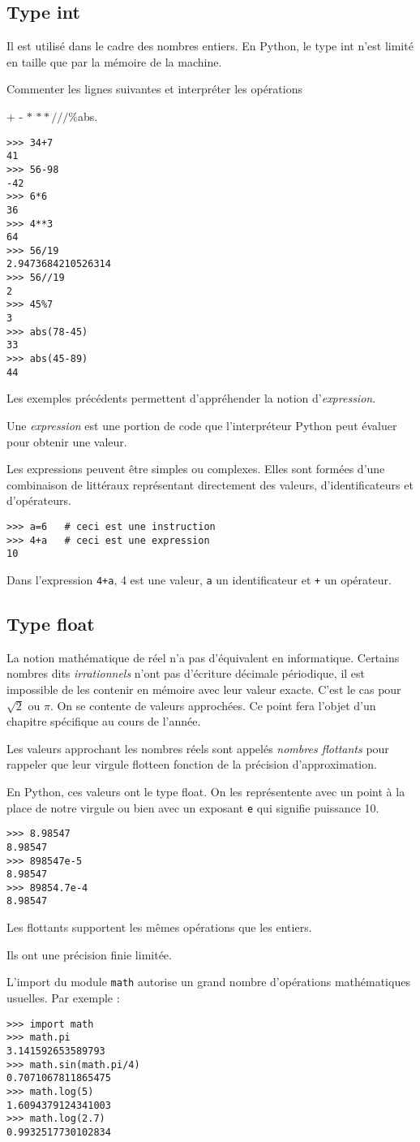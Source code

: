 \subsection{Type int}
Il est utilisé dans le cadre des nombres entiers. En Python, le type int n'est limité en taille que par la mémoire de la machine.\par
Commenter les lignes suivantes et interpréter les opérations \par
+ \quad  - \quad$*$ \quad$**$\quad $/$\quad $//$\quad $\%$\quad abs.
\begin{lstlisting}
>>> 34+7
41
>>> 56-98
-42
>>> 6*6
36
>>> 4**3
64
>>> 56/19
2.9473684210526314
>>> 56//19
2
>>> 45%7
3
>>> abs(78-45)
33
>>> abs(45-89)
44
\end{lstlisting}
Les exemples précédents permettent d'appréhender la notion d'\emph{expression}.\par
\begin{defi}[Expression] Une \emph{expression} est une portion de code que l'interpréteur Python peut évaluer pour obtenir une valeur.
\end{defi}
Les expressions peuvent être simples ou complexes. Elles sont formées d'une combinaison de littéraux représentant directement des valeurs, d'identificateurs et d'opérateurs. 
\begin{lstlisting}
>>> a=6   # ceci est une instruction
>>> 4+a   # ceci est une expression
10
\end{lstlisting}
Dans l'expression \lstinline?4+a?, 4 est une valeur, \lstinline?a? un identificateur et \lstinline?+? un opérateur.
\subsection{Type float}
La notion mathématique de réel n'a pas d'équivalent  en informatique. Certains nombres dits \emph{irrationnels} n'ont pas d'écriture décimale périodique, il est impossible de les contenir en mémoire avec leur valeur exacte. C'est le cas pour $\sqrt{2}$ ou $\pi.$ On se contente de valeurs approchées. Ce point fera l'objet d'un chapitre spécifique au cours de l'année.\par
Les valeurs approchant les nombres réels sont appelés \emph{nombres flottants} pour rappeler que leur virgule \og flotte\fg en fonction de la précision d'approximation.\par
En Python, ces valeurs ont le type float. On les représentente avec un point à la place de notre virgule ou bien avec un exposant \lstinline?e? qui signifie puissance 10.
\begin{lstlisting}
>>> 8.98547
8.98547
>>> 898547e-5
8.98547
>>> 89854.7e-4
8.98547
\end{lstlisting}
Les flottants supportent les mêmes opérations que les entiers.\par 
Ils ont une précision finie limitée.\par 
L'import du module \lstinline?math? autorise un grand nombre d'opérations mathématiques usuelles. Par exemple :
\begin{lstlisting}
>>> import math
>>> math.pi
3.141592653589793
>>> math.sin(math.pi/4)
0.7071067811865475
>>> math.log(5)
1.6094379124341003
>>> math.log(2.7)
0.9932517730102834
\end{lstlisting}
